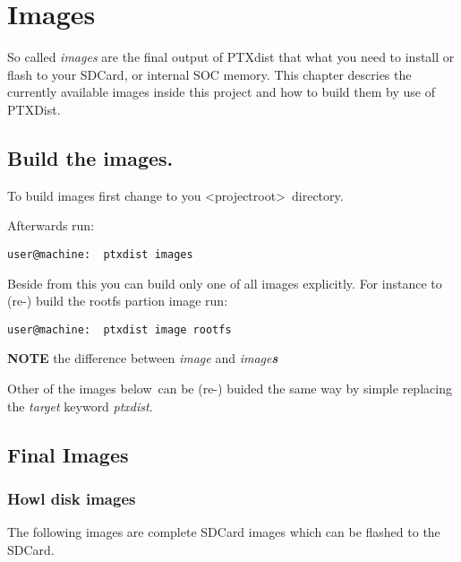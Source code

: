 \chapter{Images}%



So called \textit{images} are the final output of PTXdist that what you need to
install or flash to your SDCard, or internal SOC memory. This chapter descries
the currently available images inside this project and how to build
them by use of PTXDist.


\section{Build the images.}%
\label{sec:final_images_generation}
To build images first change to you <projectroot>~\footnotemark[1] directory.

Afterwards run:

\bigbreak%
\begin{lstlisting}[caption=Building of all Images]
user@machine:  ptxdist images
\end{lstlisting}

Beside from this you can build only one of all images explicitly. For
instance to (re-) build the rootfs partion image run:

\bigbreak%
\begin{lstlisting}[caption=Example: Build the RootFS automatically]
user@machine:  ptxdist image rootfs
\end{lstlisting}

\textbf{NOTE} the difference between \textit{image} and \textit{image\textbf{s}}
\bigbreak%

Other of the images below~\footnotemark[2] can be (re-) buided the
same way by simple replacing the \textit{target} keyword \textit{ptxdist}.

\section{Final Images}%
\label{sec:final_images}

\subsection{Howl disk images}
\label{sub:howl_disk}

The following images are complete SDCard images which can be flashed to the
SDCard.


